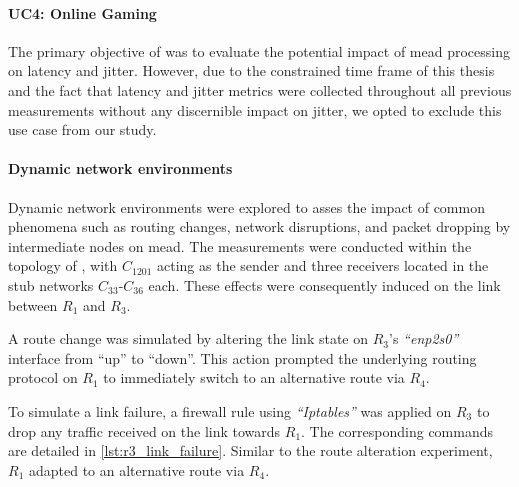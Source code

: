 \paragraph{UC4: Online Gaming} %
\label{par:UC4}
The primary objective of \uciv{} was to evaluate the potential impact of \gls{mead}
    processing on latency and jitter.
However, due to the constrained time frame of this thesis and the fact that 
    latency and jitter metrics were collected throughout all previous
    measurements without any discernible impact on jitter, we opted to exclude
    this use case from our study.

\paragraph{Dynamic network environments} %
\label{par:Dynamic network environments}
Dynamic network environments were explored to asses the impact of common
    phenomena such as routing changes, network disruptions, and packet dropping
    by intermediate nodes on \gls{mead}.
The measurements were conducted within the topology of \uciii{}, with
    $C_{1201}$ acting as the sender and three receivers located in the stub
    networks $C_{33}$-$C_{36}$ each.
These effects were consequently induced on the link between $R_1$ and $R_3$.

A route change was simulated by altering the link state on $R_3$'s
    \textit{``enp2s0''} interface from ``up'' to ``down''.
This action prompted the underlying routing protocol on $R_1$ to immediately
    switch to an alternative route via $R_4$.

To simulate a link failure, a firewall rule using \textit{``Iptables''} was
    applied on $R_3$ to drop any traffic received on the link towards $R_1$.
The corresponding commands are detailed in \autoref{lst:r3_link_failure}.
Similar to the route alteration experiment, $R_1$ adapted to an alternative route
    via $R_4$.

